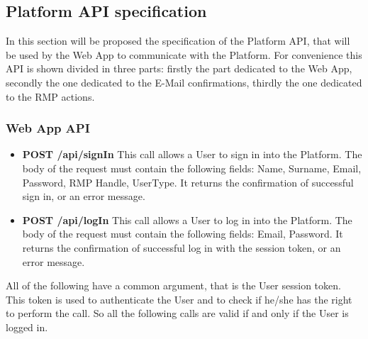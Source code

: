 \subsection{Platform API specification}
In this section will be proposed the specification of the Platform API, that will be used by the Web App to communicate with the Platform.
For convenience this API is shown divided in three parts: firstly the part dedicated to the Web App, secondly the one dedicated to the E-Mail confirmations, thirdly the one dedicated to the RMP actions.
\subsubsection{Web App API} \label{reff:apicalls}
\begin{itemize}
    \item \textbf{POST /api/signIn} This call allows a User to sign in into the Platform. The body of the request must contain the following fields: Name, Surname, Email, Password, RMP Handle, UserType. It returns the confirmation of successful sign in, or an error message.
    \item \textbf{POST /api/logIn} This call allows a User to log in into the Platform. The body of the request must contain the following fields: Email, Password. It returns the confirmation of successful log in with the session token, or an error message.
\end{itemize}
All of the following have a common argument, that is the User session token. This token is used to authenticate the User and to check if he/she has the right to perform the call. So all the following calls are valid if and only if the User is logged in.
